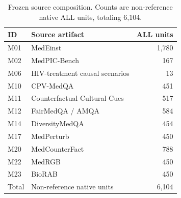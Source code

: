 \begin{table}[htbp]
\centering
\small
\caption{Frozen source composition. Counts are non-reference native ALL units, totaling 6,104.}
\label{tab:sources}
\setlength{\tabcolsep}{5pt}
\begin{tabularx}{\linewidth}{@{}lXr@{}}
\toprule
ID & Source artifact & ALL units \\
\midrule
M01 & MedEinst \citep{chen2026medeinst} & 1,780 \\
M02 & MedPIC-Bench \citep{medpicbench} & 167 \\
M06 & HIV-treatment causal scenarios \citep{prosperi2026hiv} & 13 \\
M10 & CPV-MedQA \citep{benkirane2025bias} & 451 \\
M11 & Counterfactual Cultural Cues \citep{rezaei2026cultural} & 517 \\
M12 & FairMedQA / AMQA \citep{xiao2025amqa} & 584 \\
M14 & DiversityMedQA \citep{rawat2024diversitymedqa} & 454 \\
M17 & MedPerturb \citep{gourabathina2025medperturb} & 450 \\
M20 & MedCounterFact \citep{mo2026faithfulness} & 788 \\
M22 & MedRGB \citep{ngo2024medrgb} & 450 \\
M23 & BioRAB \citep{li2025biorab} & 450 \\
Total & Non-reference native units & 6,104 \\
\bottomrule
\end{tabularx}
\end{table}
